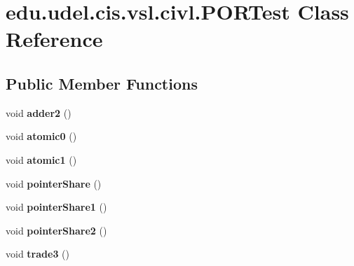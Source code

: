 \hypertarget{classedu_1_1udel_1_1cis_1_1vsl_1_1civl_1_1PORTest}{}\section{edu.\+udel.\+cis.\+vsl.\+civl.\+P\+O\+R\+Test Class Reference}
\label{classedu_1_1udel_1_1cis_1_1vsl_1_1civl_1_1PORTest}
\subsection*{Public Member Functions}
\begin{DoxyCompactItemize}
\item 
\hypertarget{classedu_1_1udel_1_1cis_1_1vsl_1_1civl_1_1PORTest_a31102eb4cc3cd5b1b848ce50ea63942e}{}void {\bfseries adder2} ()\label{classedu_1_1udel_1_1cis_1_1vsl_1_1civl_1_1PORTest_a31102eb4cc3cd5b1b848ce50ea63942e}

\item 
\hypertarget{classedu_1_1udel_1_1cis_1_1vsl_1_1civl_1_1PORTest_a2251c2b380c941bbab0a9817eb21c471}{}void {\bfseries atomic0} ()\label{classedu_1_1udel_1_1cis_1_1vsl_1_1civl_1_1PORTest_a2251c2b380c941bbab0a9817eb21c471}

\item 
\hypertarget{classedu_1_1udel_1_1cis_1_1vsl_1_1civl_1_1PORTest_a0120c860bbd8ca66769fe434b189b915}{}void {\bfseries atomic1} ()\label{classedu_1_1udel_1_1cis_1_1vsl_1_1civl_1_1PORTest_a0120c860bbd8ca66769fe434b189b915}

\item 
\hypertarget{classedu_1_1udel_1_1cis_1_1vsl_1_1civl_1_1PORTest_a315131ab2497b7c8f3e76cee0c609d01}{}void {\bfseries pointer\+Share} ()\label{classedu_1_1udel_1_1cis_1_1vsl_1_1civl_1_1PORTest_a315131ab2497b7c8f3e76cee0c609d01}

\item 
\hypertarget{classedu_1_1udel_1_1cis_1_1vsl_1_1civl_1_1PORTest_adaf827abde31967ea347b6252f7c729b}{}void {\bfseries pointer\+Share1} ()\label{classedu_1_1udel_1_1cis_1_1vsl_1_1civl_1_1PORTest_adaf827abde31967ea347b6252f7c729b}

\item 
\hypertarget{classedu_1_1udel_1_1cis_1_1vsl_1_1civl_1_1PORTest_ad31a96d254b6bc560500067ebe4f2ea8}{}void {\bfseries pointer\+Share2} ()\label{classedu_1_1udel_1_1cis_1_1vsl_1_1civl_1_1PORTest_ad31a96d254b6bc560500067ebe4f2ea8}

\item 
\hypertarget{classedu_1_1udel_1_1cis_1_1vsl_1_1civl_1_1PORTest_ab4bd7d4d1805faab4a4dbedae1e6ddee}{}void {\bfseries trade3} ()\label{classedu_1_1udel_1_1cis_1_1vsl_1_1civl_1_1PORTest_ab4bd7d4d1805faab4a4dbedae1e6ddee}


\end{DoxyCompactItemize}
